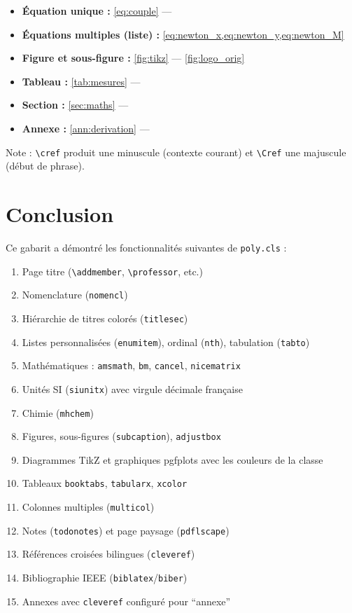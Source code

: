 \documentclass{poly}
\begin{document}
\begin{itemize}[itemsep=3pt]
    \item \textbf{Équation unique :}
          \cref{eq:couple} — 
    \item \textbf{Équations multiples (liste) :}
          \cref{eq:newton_x,eq:newton_y,eq:newton_M}
    \item \textbf{Figure et sous-figure :}
          \cref{fig:tikz} — \cref{fig:logo_orig}
    \item \textbf{Tableau :}
          \cref{tab:mesures} — 
    \item \textbf{Section :}
          \cref{sec:maths} — 
    \item \textbf{Annexe :}
          \cref{ann:derivation} — 
\end{itemize}

Note : \texttt{\textbackslash cref} produit une minuscule (contexte
courant) et \texttt{\textbackslash Cref} une majuscule (début de phrase).

\section{Conclusion}

Ce gabarit a démontré les fonctionnalités suivantes de \texttt{poly.cls} :

\begin{enumerate}[label=\arabic*., noitemsep]
    \item Page titre (\texttt{\textbackslash addmember}, \texttt{\textbackslash professor}, etc.)
    \item Nomenclature (\texttt{nomencl})
    \item Hiérarchie de titres colorés (\texttt{titlesec})
    \item Listes personnalisées (\texttt{enumitem}), ordinal (\texttt{nth}), tabulation (\texttt{tabto})
    \item Mathématiques : \texttt{amsmath}, \texttt{bm}, \texttt{cancel}, \texttt{nicematrix}
    \item Unités SI (\texttt{siunitx}) avec virgule décimale française
    \item Chimie (\texttt{mhchem})
    \item Figures, sous-figures (\texttt{subcaption}), \texttt{adjustbox}
    \item Diagrammes TikZ et graphiques pgfplots avec les couleurs de la classe
    \item Tableaux \texttt{booktabs}, \texttt{tabularx}, \texttt{xcolor}
    \item Colonnes multiples (\texttt{multicol})
    \item Notes (\texttt{todonotes}) et page paysage (\texttt{pdflscape})
    \item Références croisées bilingues (\texttt{cleveref})
    \item Bibliographie IEEE (\texttt{biblatex}/\texttt{biber}) \cite{intdesign20discoverability}
    \item Annexes avec \texttt{cleveref} configuré pour ``annexe''
\end{enumerate}
\end{document}
